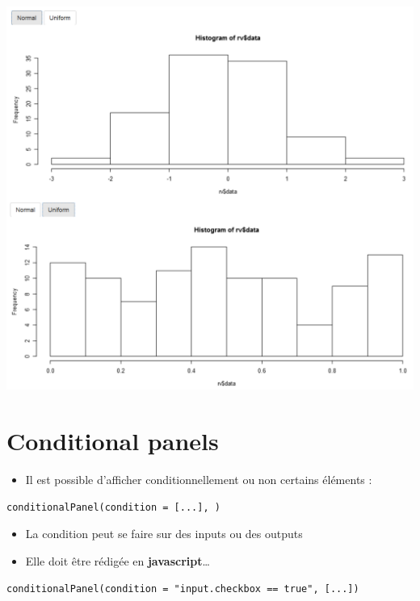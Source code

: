 \documentclass[]{article}
\providecommand{\tightlist}{%
  \setlength{\itemsep}{0pt}\setlength{\parskip}{0pt}}
\begin{document}
\includegraphics{img/RV.png}

\section{Conditional panels}\label{conditional-panels}

\begin{itemize}
\tightlist
\item
  Il est possible d'afficher conditionnellement ou non certains éléments
  :
\end{itemize}

\begin{verbatim}
conditionalPanel(condition = [...], )
\end{verbatim}

\begin{itemize}
\tightlist
\item
  La condition peut se faire sur des inputs ou des outputs
\item
  Elle doit être rédigée en \textbf{javascript}\ldots{}
\end{itemize}

\begin{verbatim}
conditionalPanel(condition = "input.checkbox == true", [...])
\end{verbatim}
\end{document}
